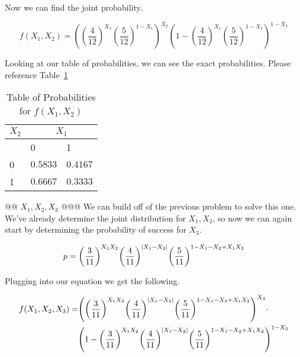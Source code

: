 \documentclass[11pt]{article}\usepackage[]{graphicx}\usepackage[]{xcolor}
\begin{document}
\begin{easylist}[enumerate]
    Now we can find the joint probability.

    \[
        f(X_1, X_2) = { \left( { \left( \frac{4}{12} \right) }^{X_1} { \left( \frac{5}{12} \right) }^{1 - X_1} \right) }^{X_2}
        { \left( 1 - { \left( \frac{4}{12} \right) }^{X_1} { \left( \frac{5}{12} \right) }^{1 - X_1} \right) }^{1 - X_2}
    \]




    Looking at our table of probabilities, we can see the exact probabilities. Please reference
    Table~\ref{table:probs.a}

    \begin{table}
        \centering
        \begin{tabular}{|l|l|l|}
            \hline
            $X_2$ & \multicolumn{2}{|c|}{$X_1$}\\
            \hline
            & 0 & 1\\
            \hline
            0 & $0.5833$ & $0.4167$\\
            1 & $0.6667$ & $0.3333$\\
            \hline
        \end{tabular}
        \caption{Table of Probabilities for $f(X_1, X_2)$}
        \label{table:probs.a}
    \end{table}

    @@ $X_1, X_2, X_3$
    @@@ We can build off of the previous problem to solve this one. We've already determine the joint distribution for
    $X_1, X_2$, so now we can again start by determining the probability of success for $X_3$.

    \[
        p = { \left( \frac{3}{11} \right) }^{X_1 X_2}
            { \left( \frac{4}{11} \right) }^{\left\lvert X_1 - X_2 \right\rvert }
            { \left( \frac{5}{11} \right) }^{1 - X_1 - X_2 + X_1 X_2}
    \]

    Plugging into our equation we get the following.

    \[
        \begin{aligned}
            f(X_1, X_2, X_3) =& { \left( { \left( \frac{3}{11} \right) }^{X_1 X_2}
                                        { \left( \frac{4}{11} \right) }^{\left\lvert X_1 - X_2 \right\rvert }
                                        { \left( \frac{5}{11} \right) }^{1 - X_1 - X_2 + X_1 X_2}
                                 \right) }^{X_3} \cdot \\
                              & { \left( 1 - { \left( \frac{3}{11} \right) }^{X_1 X_2}
                                        { \left( \frac{4}{11} \right) }^{\left\lvert X_1 - X_2 \right\rvert }
                                        { \left( \frac{5}{11} \right) }^{1 - X_1 - X_2 + X_1 X_2}
                                 \right) }^{1 - X_3}
         \end{aligned}
    \]





\end{easylist}
\end{document}
